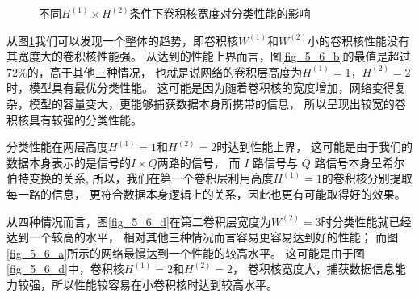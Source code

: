 \begin{figure}[!h]
	\caption{不同$H^{(1)} \times H^{(2)}$条件下卷积核宽度对分类性能的影响}
	\label{fig_5_6}
\end{figure}

从图\ref{fig_5_6}我们可以发现一个整体的趋势，即卷积核$W^{(1)}$和$W^{(2)}$小的卷积核性能没有其宽度大的卷积核性能强。
从达到的性能上界而言，图\ref{fig_5_6_b}的最值是超过$72\%$的，高于其他三种情况，
也就是说网络的卷积层高度为$H^{(1)} = 1$，$H^{(2)} = 2$时，模型具有最优分类性能。
这可能是因为随着卷积核的宽度增加，网络变得复杂，模型的容量变大，更能够捕获数据本身所携带的信息，
所以呈现出较宽的卷积核具有较强的分类性能。\par

分类性能在两层高度$H^{(1)}=1$和$H^{(2)}=2$时达到性能上界，
这可能是由于我们的数据本身表示的是信号的$I \times Q$两路的信号，
而 $I$ 路信号与 $Q$ 路信号本身呈希尔伯特变换的关系,
所以，我们在第一个卷积层利用高度$H^{(1)}=1$的卷积核分别提取每一路的信息，
更符合数据本身逻辑上的关系，因此也更有可能取得好的效果。
\par

从四种情况而言，图\ref{fig_5_6_d}在第二卷积层宽度为$W^{(2)}=3$时分类性能就已经达到一个较高的水平，
相对其他三种情况而言容易更容易达到好的性能；
而图\ref{fig_5_6_a}所示的网络最慢达到一个性能的较高水平。
这可能是由于图\ref{fig_5_6_d}中，卷积核$H^{(1)}=2$和$H^{(2)}=2$，
卷积核宽度大，捕获数据信息能力较强，所以性能较容易在小卷积核时达到较高水平。\par

